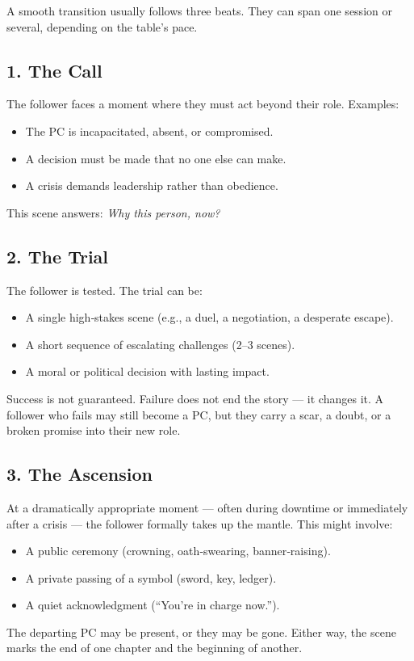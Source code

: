 A smooth transition usually follows three beats. They can span one session or several, depending on the table’s pace.

\subsection{1. The Call}
\label{subsec:succession-call}

The follower faces a moment where they must act beyond their role. Examples:
\begin{itemize}
  \item The PC is incapacitated, absent, or compromised.
  \item A decision must be made that no one else can make.
  \item A crisis demands leadership rather than obedience.
\end{itemize}
This scene answers: \textit{Why this person, now?}

\subsection{2. The Trial}
\label{subsec:succession-trial}

The follower is tested. The trial can be:
\begin{itemize}
  \item A single high‑stakes scene (e.g., a duel, a negotiation, a desperate escape).
  \item A short sequence of escalating challenges (2–3 scenes).
  \item A moral or political decision with lasting impact.
\end{itemize}
Success is not guaranteed. Failure does not end the story — it changes it. A follower who fails may still become a PC, but they carry a scar, a doubt, or a broken promise into their new role.

\subsection{3. The Ascension}
\label{subsec:succession-ascension}

At a dramatically appropriate moment — often during downtime or immediately after a crisis — the follower formally takes up the mantle. This might involve:
\begin{itemize}
  \item A public ceremony (crowning, oath‑swearing, banner‑raising).
  \item A private passing of a symbol (sword, key, ledger).
  \item A quiet acknowledgment (“You’re in charge now.”).
\end{itemize}
The departing PC may be present, or they may be gone. Either way, the scene marks the end of one chapter and the beginning of another.

